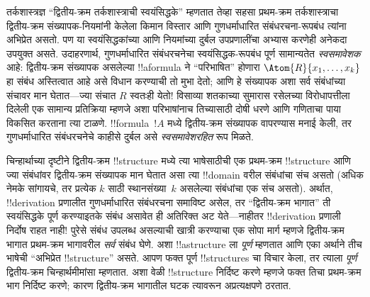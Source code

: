 \documentclass[../../../include/open-logic-section]{subfiles}
\begin{document}
तर्कशास्त्रज्ञ “द्वितीय-क्रम तर्कशास्त्राची स्वयंसिद्धके” म्हणतात तेव्हा
सहसा प्रथम-क्रम तर्कशास्त्राचा द्वितीय-क्रम संख्यापक-नियमांनी केलेला किमान
विस्तार आणि गुणधर्माधारित संबंधरचना-रूपबंध त्यांना अभिप्रेत असतो. पण या
स्वयंसिद्धकांच्या आणि नियमांच्या दुर्बल उपप्रणालींचा अभ्यास करणेही अनेकदा
उपयुक्त असते. उदाहरणार्थ, गुणधर्माधारित संबंधरचनेचा स्वयंसिद्धक-रूपबंध पूर्ण
सामान्यतेत \emph{स्वसमावेशक} आहे: द्वितीय-क्रम संख्यापक असलेल्या
!!a{formula} ने “परिभाषित” होणारा $\Atom{R}{x_1, \dots, x_k}$ हा संबंध
अस्तित्वात आहे असे विधान करण्याची तो मुभा देतो; आणि हे संख्यापक अशा सर्व
संबंधांच्या संचावर मान घेतात---ज्या संचात $R$ स्वतःही येतो!{} विसाव्या
शतकाच्या सुमारास रसेलच्या विरोधापत्तीला दिलेली एक सामान्य प्रतिक्रिया म्हणजे
अशा परिभाषांनाच तिच्यासाठी दोषी धरणे आणि गणिताचा पाया विकसित करताना त्या
टाळणे. !!{formula}~$!A$ मध्ये द्वितीय-क्रम संख्यापक वापरण्यास मनाई केली, तर
गुणधर्माधारित संबंधरचनेचे काहीसे दुर्बल असे {\em स्वसमावेशरहित} रूप मिळते.

चिन्हार्थाच्या दृष्टीने द्वितीय-क्रम !!{structure} मध्ये त्या भाषेसाठीची एक
प्रथम-क्रम !!{structure} आणि ज्या संबंधांवर द्वितीय-क्रम संख्यापक मान घेतात
असा त्या !!{domain} वरील संबंधांचा संच असतो (अधिक नेमके सांगायचे, तर प्रत्येक
$k$ साठी स्थानसंख्या~$k$ असलेल्या संबंधांचा एक संच असतो). अर्थात,
!!{derivation} प्रणालीत गुणधर्माधारित संबंधरचना समाविष्ट असेल, तर
“द्वितीय-क्रम भागात” ती स्वयंसिद्धके पूर्ण करण्याइतके संबंध असावेत ही
अतिरिक्त अट येते---नाहीतर !!{derivation} प्रणाली निर्दोष राहत नाही!{} पुरेसे
संबंध उपलब्ध असल्याची खात्री करण्याचा एक सोपा मार्ग म्हणजे द्वितीय-क्रम भागात
प्रथम-क्रम भागावरील \emph{सर्व} संबंध घेणे. अशा !!a{structure} ला
\emph{पूर्ण} म्हणतात आणि एका अर्थाने तीच भाषेची “अभिप्रेत !!{structure}”
असते. आपण फक्त पूर्ण !!{structure}s चा विचार केला, तर त्याला
\emph{पूर्ण} द्वितीय-क्रम चिन्हार्थमीमांसा म्हणतात. अशा वेळी !!{structure}
निर्दिष्ट करणे म्हणजे फक्त तिचा प्रथम-क्रम भाग निर्दिष्ट करणे; कारण
द्वितीय-क्रम भागातील घटक त्यावरून अप्रत्यक्षपणे ठरतात.
\end{document}

